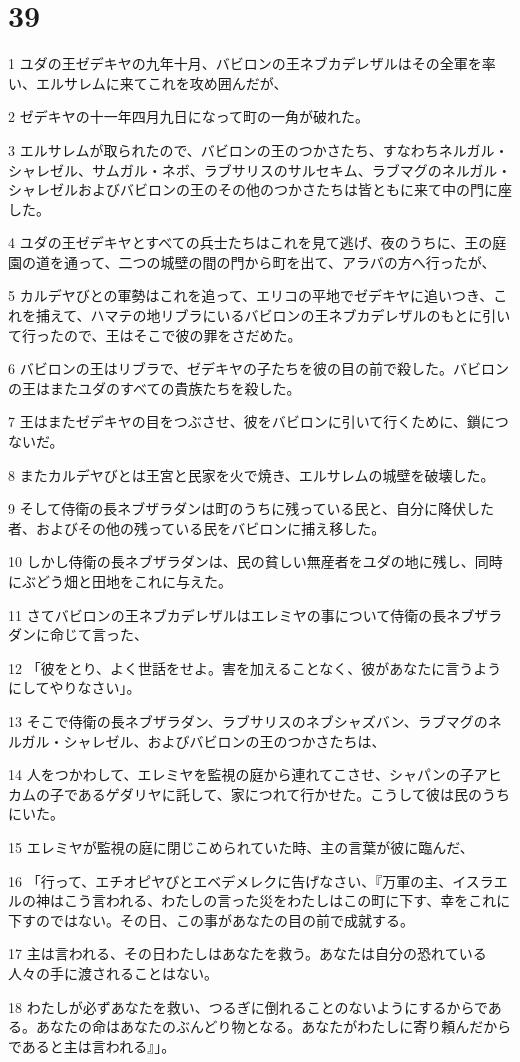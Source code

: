 \chapter{39}

\par 1 ユダの王ゼデキヤの九年十月、バビロンの王ネブカデレザルはその全軍を率い、エルサレムに来てこれを攻め囲んだが、
\par 2 ゼデキヤの十一年四月九日になって町の一角が破れた。
\par 3 エルサレムが取られたので、バビロンの王のつかさたち、すなわちネルガル・シャレゼル、サムガル・ネボ、ラブサリスのサルセキム、ラブマグのネルガル・シャレゼルおよびバビロンの王のその他のつかさたちは皆ともに来て中の門に座した。
\par 4 ユダの王ゼデキヤとすべての兵士たちはこれを見て逃げ、夜のうちに、王の庭園の道を通って、二つの城壁の間の門から町を出て、アラバの方へ行ったが、
\par 5 カルデヤびとの軍勢はこれを追って、エリコの平地でゼデキヤに追いつき、これを捕えて、ハマテの地リブラにいるバビロンの王ネブカデレザルのもとに引いて行ったので、王はそこで彼の罪をさだめた。
\par 6 バビロンの王はリブラで、ゼデキヤの子たちを彼の目の前で殺した。バビロンの王はまたユダのすべての貴族たちを殺した。
\par 7 王はまたゼデキヤの目をつぶさせ、彼をバビロンに引いて行くために、鎖につないだ。
\par 8 またカルデヤびとは王宮と民家を火で焼き、エルサレムの城壁を破壊した。
\par 9 そして侍衛の長ネブザラダンは町のうちに残っている民と、自分に降伏した者、およびその他の残っている民をバビロンに捕え移した。
\par 10 しかし侍衛の長ネブザラダンは、民の貧しい無産者をユダの地に残し、同時にぶどう畑と田地をこれに与えた。
\par 11 さてバビロンの王ネブカデレザルはエレミヤの事について侍衛の長ネブザラダンに命じて言った、
\par 12 「彼をとり、よく世話をせよ。害を加えることなく、彼があなたに言うようにしてやりなさい」。
\par 13 そこで侍衛の長ネブザラダン、ラブサリスのネブシャズバン、ラブマグのネルガル・シャレゼル、およびバビロンの王のつかさたちは、
\par 14 人をつかわして、エレミヤを監視の庭から連れてこさせ、シャパンの子アヒカムの子であるゲダリヤに託して、家につれて行かせた。こうして彼は民のうちにいた。
\par 15 エレミヤが監視の庭に閉じこめられていた時、主の言葉が彼に臨んだ、
\par 16 「行って、エチオピヤびとエベデメレクに告げなさい、『万軍の主、イスラエルの神はこう言われる、わたしの言った災をわたしはこの町に下す、幸をこれに下すのではない。その日、この事があなたの目の前で成就する。
\par 17 主は言われる、その日わたしはあなたを救う。あなたは自分の恐れている人々の手に渡されることはない。
\par 18 わたしが必ずあなたを救い、つるぎに倒れることのないようにするからである。あなたの命はあなたのぶんどり物となる。あなたがわたしに寄り頼んだからであると主は言われる』」。

